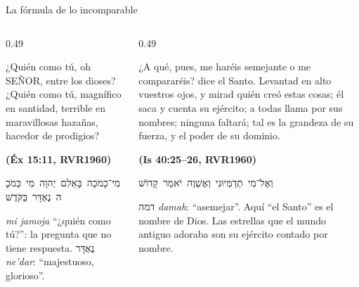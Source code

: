 \documentclass[hyperref={bookmarks=false},aspectratio=169]{beamer}
\newcommand{\heb}[1]{\mbox{\foreignlanguage{hebrew}{#1}}}
\newcommand{\SENOR}{S{\fontsize{0.78em}{1em}\selectfont EÑOR}}
\newcommand{\fuente}[1]{\par\hfill{\upshape\bfseries\footnotesize\textcolor{azul}{#1}}}
\begin{document}
\begin{frame}{La fórmula de lo incomparable}
\begin{columns}[t,onlytextwidth]
\begin{column}{0.49\textwidth}
\begin{cita}¿Quién como tú, oh \SENOR, entre los dioses? ¿Quién como tú, magnífico en santidad, terrible en maravillosas hazañas, hacedor de prodigios?\fuente{(Éx 15:11, RVR1960)}\end{cita}
\scriptsize\heb{מִי־כָמֹכָה בָּאֵלִם יְהוָה מִי כָּמֹכָה נֶאְדָּר בַּקֹּדֶשׁ}\par
\emph{mi jamoja} ``¿quién como tú?'': la pregunta que no tiene respuesta. \heb{נֶאְדָּר} \emph{ne'dar}: ``majestuoso, glorioso''.
\end{column}
\begin{column}{0.49\textwidth}
\begin{cita}¿A qué, pues, me haréis semejante o me compararéis? dice el Santo. Levantad en alto vuestros ojos, y mirad quién creó estas cosas; él saca y cuenta su ejército; a todas llama por sus nombres; ninguna faltará; tal es la grandeza de su fuerza, y el poder de su dominio.\fuente{(Is 40:25--26, RVR1960)}\end{cita}
\scriptsize\heb{וְאֶל־מִי תְדַמְּיוּנִי וְאֶשְׁוֶה יֹאמַר קָדוֹשׁ}\par
\heb{דמה} \emph{damah}: ``asemejar''. Aquí ``el Santo'' es el nombre de Dios. Las estrellas que el mundo antiguo adoraba son su ejército contado por nombre.
\end{column}
\end{columns}
\end{frame}
\end{document}
